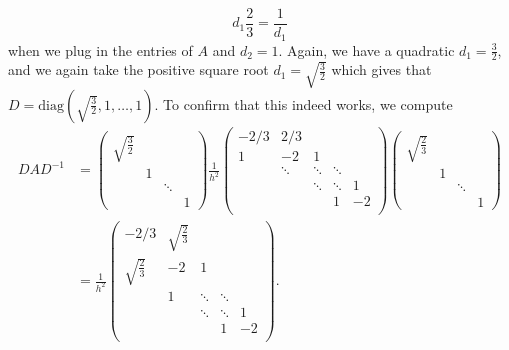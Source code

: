 \documentclass{article}
\begin{document}
\[
d_1\frac{2}{3}=\frac{1}{d_1}
\]
when we plug in the entries of $A$ and $d_2=1$. Again, we have a quadratic $d_1=\frac{3}{2}$, and we again take the positive square root $d_1=\sqrt{\frac{3}{2}}$ which gives that $D=\text{diag}\left(\sqrt{\frac{3}{2}},1,\ldots,1\right)$. To confirm that this indeed works, we compute
\begin{align*}
DAD^{-1}&=\begin{pmatrix}
\sqrt{\frac{3}{2}}\\
&1\\
&&\ddots\\
&&&1
\end{pmatrix}\frac{1}{h^2}
            \begin{pmatrix}
                -2/3 & 2/3 \\
                1 &-2 &1\\
                & \ddots & \ddots & \ddots \\
                && \ddots & \ddots & 1\\
                &&& 1 & -2 \\
            \end{pmatrix}
\begin{pmatrix}
\sqrt{\frac{2}{3}}\\
&1\\
&&\ddots\\
&&&1
\end{pmatrix}\\&=
\frac{1}{h^2}
            \begin{pmatrix}
                -2/3 & \sqrt{\frac{2}{3}} \\
                \sqrt{\frac{2}{3}} &-2 &1\\
                & 1 & \ddots & \ddots \\
                && \ddots & \ddots & 1\\
                &&& 1 & -2 \\
            \end{pmatrix}.
\end{align*}
\end{document}
